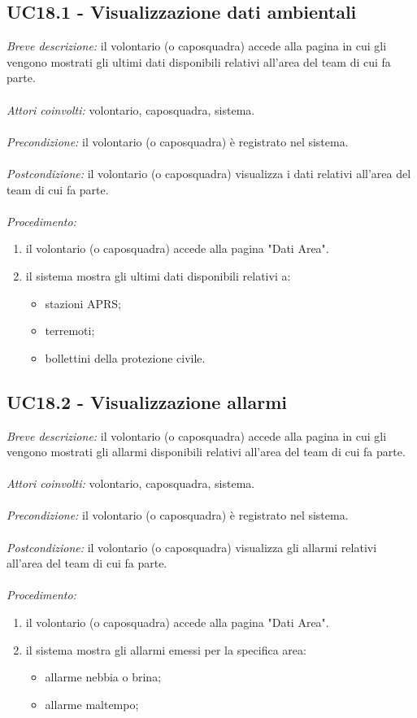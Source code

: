 \subsection{UC18.1 - Visualizzazione dati ambientali}
\textit{Breve descrizione:} il volontario (o caposquadra) accede alla pagina in cui gli vengono mostrati gli ultimi dati disponibili relativi all'area del team di cui fa parte. 
\\
\\
\textit{Attori coinvolti:} volontario, caposquadra, sistema.
\\
\\
\textit{Precondizione:} il volontario (o caposquadra) è registrato nel sistema.
\\
\\
\textit{Postcondizione:} il volontario (o caposquadra) visualizza i dati relativi all'area del team di cui fa parte.
\\
\\
\textit{Procedimento:}
\begin{enumerate}
	\item il volontario (o caposquadra) accede alla pagina "Dati Area".
	\item il sistema mostra gli ultimi dati disponibili relativi a:
	\begin{itemize}
		\item stazioni APRS;
		\item terremoti;
		\item bollettini della protezione civile.
	\end{itemize}
\end{enumerate}

\subsection{UC18.2 - Visualizzazione allarmi}
\textit{Breve descrizione:} il volontario (o caposquadra) accede alla pagina in cui gli vengono mostrati gli allarmi disponibili relativi all'area del team di cui fa parte. 
\\
\\
\textit{Attori coinvolti:} volontario, caposquadra, sistema.
\\
\\
\textit{Precondizione:} il volontario (o caposquadra) è registrato nel sistema.
\\
\\
\textit{Postcondizione:} il volontario (o caposquadra) visualizza gli allarmi relativi all'area del team di cui fa parte.
\\
\\
\textit{Procedimento:}
\begin{enumerate}
	\item il volontario (o caposquadra) accede alla pagina "Dati Area".
	\item il sistema mostra gli allarmi emessi per la specifica area:
	\begin{itemize}
		\item allarme nebbia o brina;
		\item allarme maltempo;
	\end{itemize}
\end{enumerate}
